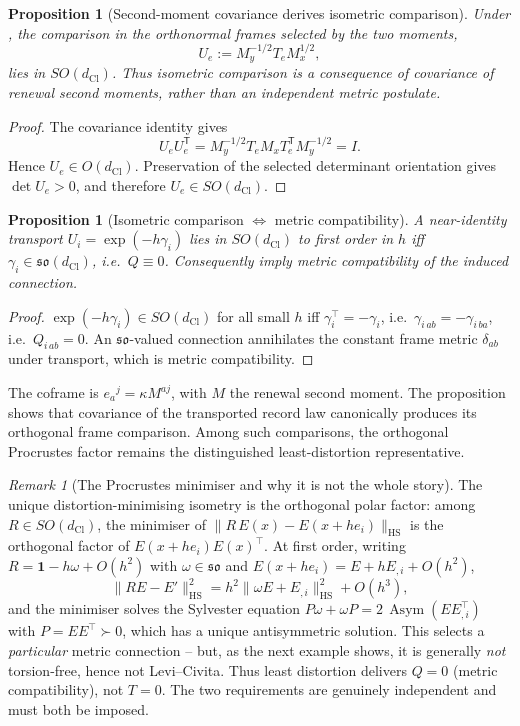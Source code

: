 \documentclass[11pt]{article}
\newtheorem{proposition}[theorem]{Proposition}
\theoremstyle{definition}
\theoremstyle{remark}
\newtheorem{remark}[theorem]{Remark}
\newcommand{\dCl}{d_{\mathrm{Cl}}}
\newcommand{\one}{\mathbf{1}}
\newcommand{\Asym}{\operatorname{Asym}}
\newcommand{\so}{\mathfrak{so}}
\newcommand{\HS}{\mathrm{HS}}
\begin{document}
\begin{proposition}[Second-moment covariance derives isometric comparison]
\label{prop:second-moment-isometry}
Under , the comparison in the orthonormal
frames selected by the two moments,
\[
   U_e:=M_y^{-1/2}T_eM_x^{1/2},
\]
lies in \(SO(\dCl)\).  Thus isometric comparison is a consequence of covariance
of renewal second moments, rather than an independent metric postulate.
\end{proposition}

\begin{proof}
The covariance identity gives
\[
   U_eU_e^{\mathsf T}
   =M_y^{-1/2}T_eM_xT_e^{\mathsf T}M_y^{-1/2}
   =I.
\]
Hence \(U_e\in O(\dCl)\).  Preservation of the selected determinant orientation
gives \(\det U_e>0\), and therefore \(U_e\in SO(\dCl)\).
\end{proof}

\begin{proposition}[Isometric comparison $\Leftrightarrow$ metric compatibility]
\label{prop:iso-metric}
A near-identity transport $U_i=\exp(-h\gamma_i)$ lies in $SO(\dCl)$
to first order in $h$ iff $\gamma_i\in\so(\dCl)$, i.e.\ $Q\equiv0$.
Consequently 
imply metric compatibility of the induced connection.
\end{proposition}

\begin{proof}
$\exp(-h\gamma_i)\in SO(\dCl)$ for all small $h$ iff $\gamma_i^\top=-\gamma_i$,
i.e.\ $\gamma_{i\,ab}=-\gamma_{i\,ba}$, i.e.\ $Q_{i\,ab}=0$.  An $\so$-valued
connection annihilates the constant frame metric $\delta_{ab}$ under transport,
which is metric compatibility.
\end{proof}

The coframe is \(e_a{}^j=\kappa M^{aj}\), with \(M\) the renewal second moment.
The proposition shows that covariance of the transported record law canonically
produces its orthogonal frame comparison.  Among such comparisons, the
orthogonal Procrustes factor remains the distinguished least-distortion
representative.

\begin{remark}[The Procrustes minimiser and why it is not the whole story]
\label{rem:procrustes}
The unique distortion-minimising isometry is the orthogonal polar
factor: among $R\in SO(\dCl)$, the minimiser of $\|R\,E(x)-E(x+he_i)\|_{\HS}$ is
the orthogonal factor of $E(x+he_i)E(x)^\top$.  At first order, writing
$R=\one-h\omega+O(h^2)$ with $\omega\in\so$ and $E(x+he_i)=E+hE_{,i}+O(h^2)$,
\[
  \|R E-E'\|_{\HS}^2=h^2\|\omega E+E_{,i}\|_{\HS}^2+O(h^3),
\]
and the minimiser solves the Sylvester equation $P\omega+\omega P=2\,
\Asym(EE_{,i}^\top)$ with $P=EE^\top\succ0$, which has a unique antisymmetric
solution.  This selects a \emph{particular} metric connection -- but, as the next
example shows, it is generally \emph{not} torsion-free, hence not Levi--Civita.
Thus least distortion delivers $Q=0$ (metric compatibility), not $T=0$.  The
two requirements are genuinely independent and must both be imposed.
\end{remark}
\end{document}
